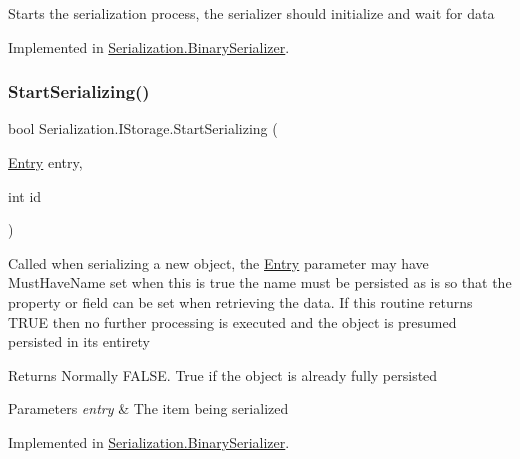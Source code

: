 Starts the serialization process, the serializer should initialize and wait for data 



Implemented in \hyperlink{class_serialization_1_1_binary_serializer_a7266eb0f6366fe0d40bbcb9d4434f262}{Serialization.\+Binary\+Serializer}.

\mbox{\label{interface_serialization_1_1_i_storage_a62f447c10caea0bd0c2ec3bad36fe14a}} 
\subsubsection{\texorpdfstring{Start\+Serializing()}{StartSerializing()}\hspace{0.1cm}{\footnotesize\ttfamily [2/2]}}
{\footnotesize\ttfamily bool Serialization.\+I\+Storage.\+Start\+Serializing (\begin{DoxyParamCaption}\item[{\hyperlink{class_serialization_1_1_entry}{Entry}}]{entry,  }\item[{int}]{id }\end{DoxyParamCaption})}



Called when serializing a new object, the \hyperlink{class_serialization_1_1_entry}{Entry} parameter may have Must\+Have\+Name set when this is true the name must be persisted as is so that the property or field can be set when retrieving the data. If this routine returns T\+R\+UE then no further processing is executed and the object is presumed persisted in its entirety 

\begin{DoxyReturn}{Returns}
Normally F\+A\+L\+SE. True if the object is already fully persisted
\end{DoxyReturn}

\begin{DoxyParams}{Parameters}
{\em entry} & The item being serialized\\
\hline
\end{DoxyParams}


Implemented in \hyperlink{class_serialization_1_1_binary_serializer_aef0fdf4b432dfe09b1bf9c11786dee58}{Serialization.\+Binary\+Serializer}.

